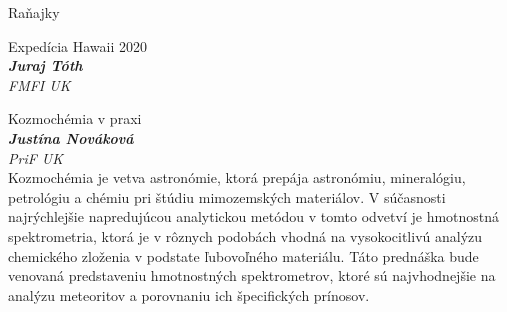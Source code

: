 \documentclass[a4paper]{report}
\begin{document}
                    \begin{tcolorbox}[
                                    colback=red!10,
                    colframe=red!50!black,
                                fonttitle=\Large\bfseries,
                title=09:00
            ]
                {\Large Raňajky}
                                                            \end{tcolorbox}
                    \begin{tcolorbox}[
                                    colback=white,
                    colframe=black!70!white,
                                fonttitle=\Large\bfseries,
                title=10:00
            ]
                {\Large Expedícia Hawaii 2020}
                                                            \\ \textbf{\textit{Juraj Tóth}}
                                                    \\ \textit{FMFI UK}                            \end{tcolorbox}
                    \begin{tcolorbox}[
                                    colback=white,
                    colframe=black!70!white,
                                fonttitle=\Large\bfseries,
                title=10:30
            ]
                {\Large Kozmochémia v praxi}
                                                            \\ \textbf{\textit{Justína Nováková}}
                                                    \\ \textit{PriF UK}                \\[2ex]Kozmochémia je vetva astronómie, ktorá prepája astronómiu, mineralógiu, petrológiu a chémiu pri štúdiu mimozemských materiálov. V súčasnosti najrýchlejšie napredujúcou analytickou metódou v tomto odvetví je hmotnostná spektrometria, ktorá je v rôznych podobách vhodná na vysokocitlivú analýzu chemického zloženia v podstate ľubovoľného materiálu. Táto prednáška bude venovaná predstaveniu hmotnostných spektrometrov, ktoré sú najvhodnejšie na analýzu meteoritov a porovnaniu ich špecifických prínosov.
            \end{tcolorbox}
\end{document}
